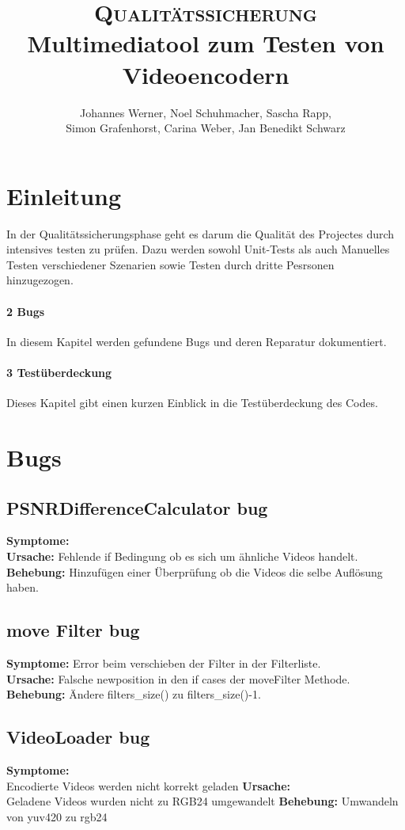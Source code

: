 \documentclass{scrartcl}
\title{\fontsize{40}{48} \selectfont \textsc{Qualitätssicherung}\\
{\fontsize{18}{18} \selectfont Multimediatool zum Testen von Videoencodern}}}
\author {Johannes Werner, Noel Schuhmacher, Sascha Rapp,\\ Simon Grafenhorst,
Carina Weber, Jan Benedikt Schwarz}
\begin{document}
 {
\maketitle
\thispagestyle{empty}
\pagestyle{empty}
\newpage
\setcounter{page}{0}
\tableofcontents
\clearpage
\pagestyle{plain}
\newpage
\section{Einleitung}
In der Qualitätssicherungsphase geht es darum die Qualität des Projectes  durch intensives testen zu prüfen. Dazu werden sowohl Unit-Tests als auch Manuelles Testen verschiedener Szenarien sowie Testen durch dritte Pesrsonen hinzugezogen.
\paragraph{2 Bugs} In diesem Kapitel werden gefundene Bugs und deren Reparatur dokumentiert.
\paragraph{3 Testüberdeckung} Dieses Kapitel gibt einen kurzen Einblick in die Testüberdeckung des Codes.
\newpage
\section{Bugs}
\subsection{PSNRDifferenceCalculator bug}
\textbf{Symptome:}\\
\textbf{Ursache:} Fehlende if Bedingung ob es sich um ähnliche Videos handelt.\\
\textbf{Behebung:} Hinzufügen einer Überprüfung ob die Videos die selbe Auflösung haben.
\subsection{move Filter bug}
\textbf{Symptome:} Error beim verschieben der Filter in der Filterliste.\\
\textbf{Ursache:} Falsche newposition in den if cases der moveFilter Methode.\\
\textbf{Behebung:} Ändere filters\_size() zu filters\_size()-1.
\subsection{VideoLoader bug}
\textbf{Symptome:}\\
Encodierte Videos werden nicht korrekt geladen
\textbf{Ursache:}\\
Geladene Videos wurden nicht zu RGB24 umgewandelt
\textbf{Behebung:}
Umwandeln von yuv420 zu rgb24
}
\end{document}
